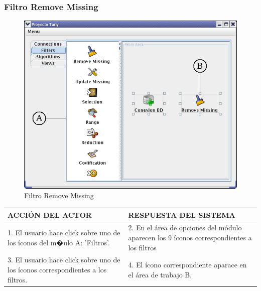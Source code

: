 \newpage
\subsubsection{Filtro Remove Missing}
\begin{figure}[ht]
\centering
\includegraphics[width=1\textwidth]{images/17.png}
\caption{Filtro Remove Missing}
\end{figure}
\begin{center}
\begin{tabular}{|p{60mm}|p{60mm}|} \hline
ACCI\'ON DEL ACTOR & RESPUESTA DEL SISTEMA \\ \hline
1. El usuario hace click sobre uno de los \'iconos del m�ulo A: 'Filtros'.   & 2. En el \'area de opciones del m\'odulo aparecen los 9 \'iconos correspondientes a los filtros\\ \hline
3. El usuario hace click sobre uno de los \'iconos correspondientes a los filtros. & 4. El \'icono correspondiente aparace en el \'area de trabajo B.\\ \hline
\end{tabular}
\end{center}

\newpage
